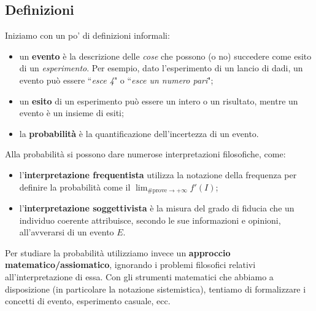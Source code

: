 \begin{figure}[h]
\end{figure}


\subsection{Definizioni}
Iniziamo con un po' di definizioni informali: \begin{itemize}
    \item un \textbf{evento} è la descrizione delle \textit{cose} che possono (o no) succedere come esito di un \textit{esperimento}. Per esempio, dato l'esperimento di un lancio di dadi, un evento può essere ``\textit{esce 4}" o ``\textit{esce un numero pari}";
    \item un \textbf{esito} di un esperimento può essere un intero o un risultato, mentre un evento è un insieme di esiti;
    \item la \textbf{probabilità} è la quantificazione dell'incertezza di un evento. 
\end{itemize}

\noindent Alla probabilità si possono dare numerose interpretazioni filosofiche, come: \begin{itemize}
    \item l'\textbf{interpretazione frequentista} utilizza la notazione della frequenza per definire la probabilità come il $\lim_{\text{\# prove} \rightarrow +\infty} f'(I)$;
    \item l'\textbf{interpretazione soggettivista} è la misura del grado di fiducia che un individuo coerente attribuisce, secondo le sue informazioni e opinioni, all'avverarsi di un evento $E$. 
\end{itemize}

\noindent Per studiare la probabilità utilizziamo invece un \textbf{approccio matematico/assiomatico}, ignorando i problemi filosofici relativi all'interpretazione di essa.
Con gli strumenti matematici che abbiamo a disposizione (in particolare la notazione sistemistica), tentiamo di formalizzare i concetti di evento, esperimento casuale, ecc.

